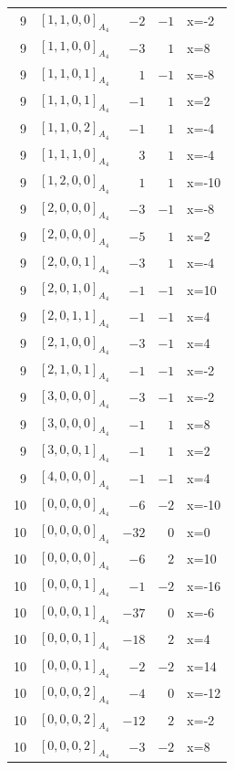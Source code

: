 \documentclass[11pt]{article}
\newcommand{\Dynkin}[1]{#1}
\begin{document}
\begin{longtable}{r l r r l}
9 & $\Dynkin{[1,1,0,0]_{A_4}}$ & $-2$ & $-1$ & x=-2\\
9 & $\Dynkin{[1,1,0,0]_{A_4}}$ & $-3$ & $1$ & x=8\\
9 & $\Dynkin{[1,1,0,1]_{A_4}}$ & $1$ & $-1$ & x=-8\\
9 & $\Dynkin{[1,1,0,1]_{A_4}}$ & $-1$ & $1$ & x=2\\
9 & $\Dynkin{[1,1,0,2]_{A_4}}$ & $-1$ & $1$ & x=-4\\
9 & $\Dynkin{[1,1,1,0]_{A_4}}$ & $3$ & $1$ & x=-4\\
9 & $\Dynkin{[1,2,0,0]_{A_4}}$ & $1$ & $1$ & x=-10\\
9 & $\Dynkin{[2,0,0,0]_{A_4}}$ & $-3$ & $-1$ & x=-8\\
9 & $\Dynkin{[2,0,0,0]_{A_4}}$ & $-5$ & $1$ & x=2\\
9 & $\Dynkin{[2,0,0,1]_{A_4}}$ & $-3$ & $1$ & x=-4\\
9 & $\Dynkin{[2,0,1,0]_{A_4}}$ & $-1$ & $-1$ & x=10\\
9 & $\Dynkin{[2,0,1,1]_{A_4}}$ & $-1$ & $-1$ & x=4\\
9 & $\Dynkin{[2,1,0,0]_{A_4}}$ & $-3$ & $-1$ & x=4\\
9 & $\Dynkin{[2,1,0,1]_{A_4}}$ & $-1$ & $-1$ & x=-2\\
9 & $\Dynkin{[3,0,0,0]_{A_4}}$ & $-3$ & $-1$ & x=-2\\
9 & $\Dynkin{[3,0,0,0]_{A_4}}$ & $-1$ & $1$ & x=8\\
9 & $\Dynkin{[3,0,0,1]_{A_4}}$ & $-1$ & $1$ & x=2\\
9 & $\Dynkin{[4,0,0,0]_{A_4}}$ & $-1$ & $-1$ & x=4\\
10 & $\Dynkin{[0,0,0,0]_{A_4}}$ & $-6$ & $-2$ & x=-10\\
10 & $\Dynkin{[0,0,0,0]_{A_4}}$ & $-32$ & $0$ & x=0\\
10 & $\Dynkin{[0,0,0,0]_{A_4}}$ & $-6$ & $2$ & x=10\\
10 & $\Dynkin{[0,0,0,1]_{A_4}}$ & $-1$ & $-2$ & x=-16\\
10 & $\Dynkin{[0,0,0,1]_{A_4}}$ & $-37$ & $0$ & x=-6\\
10 & $\Dynkin{[0,0,0,1]_{A_4}}$ & $-18$ & $2$ & x=4\\
10 & $\Dynkin{[0,0,0,1]_{A_4}}$ & $-2$ & $-2$ & x=14\\
10 & $\Dynkin{[0,0,0,2]_{A_4}}$ & $-4$ & $0$ & x=-12\\
10 & $\Dynkin{[0,0,0,2]_{A_4}}$ & $-12$ & $2$ & x=-2\\
10 & $\Dynkin{[0,0,0,2]_{A_4}}$ & $-3$ & $-2$ & x=8\\

\end{longtable}
\end{document}
